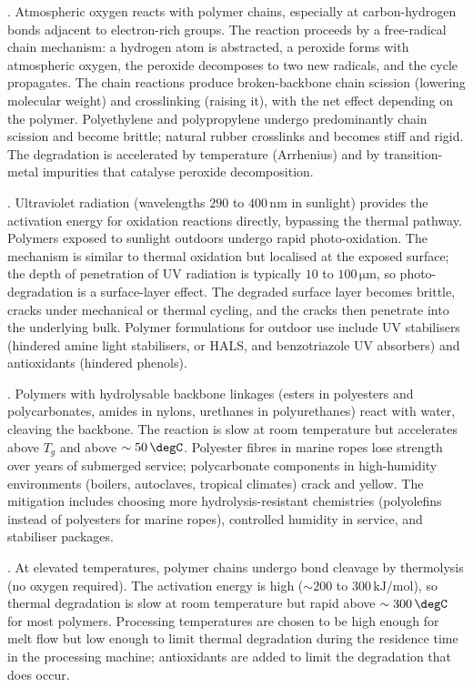 . Atmospheric oxygen reacts with polymer chains,
especially at carbon-hydrogen bonds adjacent to electron-rich groups.
The reaction proceeds by a free-radical chain mechanism: a hydrogen
atom is abstracted, a peroxide forms with atmospheric oxygen, the
peroxide decomposes to two new radicals, and the cycle propagates.
The chain reactions produce broken-backbone chain scission (lowering
molecular weight) and crosslinking (raising it), with the net effect
depending on the polymer. Polyethylene and polypropylene undergo
predominantly chain scission and become brittle; natural rubber
crosslinks and becomes stiff and rigid. The degradation is
accelerated by temperature (Arrhenius) and by transition-metal
impurities that catalyse peroxide decomposition.

. Ultraviolet radiation (wavelengths $290$ to
$400\,\text{nm}$ in sunlight) provides the activation energy for
oxidation reactions directly, bypassing the thermal pathway. Polymers
exposed to sunlight outdoors undergo rapid photo-oxidation. The
mechanism is similar to thermal oxidation but localised at the
exposed surface; the depth of penetration of UV radiation is typically
$10$ to $100\,\si{\micro\meter}$, so photo-degradation is a
surface-layer effect. The degraded surface layer becomes brittle,
cracks under mechanical or thermal cycling, and the cracks then
penetrate into the underlying bulk. Polymer formulations for outdoor
use include UV stabilisers (hindered amine light stabilisers, or
HALS, and benzotriazole UV absorbers) and antioxidants (hindered
phenols).

. Polymers with hydrolysable backbone linkages
(esters in polyesters and polycarbonates, amides in nylons, urethanes
in polyurethanes) react with water, cleaving the backbone. The
reaction is slow at room temperature but accelerates above $T_g$ and
above $\sim 50\,\degC$. Polyester fibres in marine ropes lose strength
over years of submerged service; polycarbonate components in
high-humidity environments (boilers, autoclaves, tropical climates)
crack and yellow. The mitigation includes choosing more
hydrolysis-resistant chemistries (polyolefins instead of polyesters
for marine ropes), controlled humidity in service, and stabiliser
packages.

. At elevated temperatures, polymer chains
undergo bond cleavage by thermolysis (no oxygen required). The
activation energy is high ($\sim 200$ to $300\,\text{kJ}/\text{mol}$),
so thermal degradation is slow at room temperature but rapid above
$\sim 300\,\degC$ for most polymers. Processing temperatures are
chosen to be high enough for melt flow but low enough to limit
thermal degradation during the residence time in the processing
machine; antioxidants are added to limit the degradation that does
occur.

